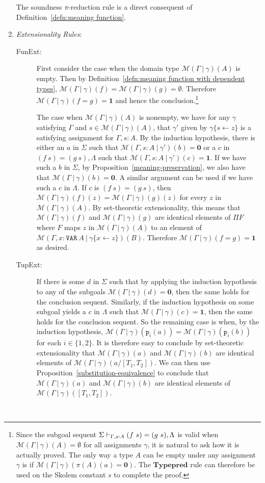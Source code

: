 \documentclass [12pt,twoside]{cslreport}
\newcommand{\thmbox}
   {{\ \hfill\hbox{%
      \vrule width1.0ex height1.0ex
   }\parfillskip 0pt }}
\newenvironment{proof}{{\bf Proof. }}{\thmbox}
\newcommand{\tupletype}[1]{[#1]}
\newcommand{\Mgamma}[1]{{\mathcal M}(\Gamma\vbar\gamma)(#1)}
\newcommand{\proj}[1]{\mathtt{p}_{#1}}
\newcommand{\listwo}[2]{#1_{1}, #1_{2}}
\newcommand{\oneb}{\mathbf{1}}
\newcommand{\zerob}{\mathbf{0}}
\newcommand{\ttvar}{\mathtt{VAR}}
\newcommand{\vbar}{\ |\ }
\begin{document}
\begin{proof}
\begin{enumerate}
The soundness $\pi$-reduction rule is a direct consequent of
Definition~\ref{defn:meaning function}\@.

\item \emph{Extensionality Rules}:
\begin{description}
\item [FunExt:] 
First consider the case when the domain type $\Mgamma{A}$ is empty.  Then by
Definition~\ref{defn:meaning function with dependent types},
$\Mgamma{f} = \Mgamma{g} = \emptyset$\@.  Therefore $\Mgamma{f = g} =
\oneb$ and hence the conclusion.\footnote{Since
the  subgoal sequent $\Sigma\vdash_{\Gamma, s:A}(f~s) =
(g~s),\Lambda$
is valid when $\Mgamma{A} = \emptyset$ for all assignments $\gamma$,
it is natural to ask how it is actually proved.  The only
way a type $A$ can be empty under any assignment $\gamma$ is if
$\Mgamma{\pi(A)(a) = \zerob}$.  The $\mathbf{Typepred}$ rule can
therefore be used on the Skolem constant $s$ to complete the proof.}

The case when $\Mgamma{A}$ is nonempty, we have for any $\gamma$
satisfying $\Gamma$ and $s\in \Mgamma{A}$, that $\gamma'$ given by 
$\gamma\{s\gets z\}$ is a satisfying assignment for $\Gamma, s: A$\@.
By the induction hypothesis, there is either an $a$ in $\Sigma$
such that $\mathcal{M}(\Gamma, s: A\vbar\gamma')(b) = \zerob$ or
a $c$ in  ${(f~s) = (g~s),\Lambda}$ such that $\mathcal{M}(\Gamma, s:
A\vbar\gamma')(c) = \oneb$\@.  If we have such a $b$ in $\Sigma$,
by Proposition~\ref{meaning-preservation}, we also have that
$\Mgamma{b} = \zerob$.  A similar argument can be used
if we have such a $c$ in $\Lambda$\@.  If $c$ is $(f~s) = (g~s)$, then
$\Mgamma{f}(z) = \Mgamma{g}(z)$ for every $z$ in $\Mgamma{A}$\@.
By set-theoretic extensionality, this means that $\Mgamma{f}$ and
$\Mgamma{g}$ are identical elements 
of $\Pi{}F$ where $F$ maps $z$ in $\Mgamma{A}$ to an element of
$\mathcal{M}(\Gamma, x : \ttvar~A\vbar \gamma\{x \gets z\})(B)$\@.
Therefore $\Mgamma{f = g} = \oneb$ as desired.

\item [TupExt:]  If there is some $d$ in $\Sigma$ such that by applying the
induction hypothesis to any of the subgoals $\Mgamma{d} = \zerob$,
then the same holds for the conclusion sequent.  Similarly,
if the induction hypothesis on some subgoal yields a $c$ in $\Lambda$
such that $\Mgamma{c} = \oneb$, then the same holds for the
conclusion sequent.  So the remaining case is when, by the
induction hypothesis, 
$\Mgamma{\proj{i}(a)} = \Mgamma{\proj{i}(b)}$ for each $i\in \{1,2\}$.
It is therefore easy to conclude by set-theoretic extensionality that
$\Mgamma{a}$ and $\Mgamma{b}$ are identical elements of
$\Mgamma{a/\tupletype{\listwo{T}{n}}}$\@.  We can then use
Proposition~\ref{substitution-equivalence} to conclude
that $\Mgamma{a}$ and $\Mgamma{b}$ are identical
elements of $\Mgamma{\tupletype{\listwo{T}{n}}}$\@. 


\end{description}
\end{enumerate}
\end{proof}
\end{document}
